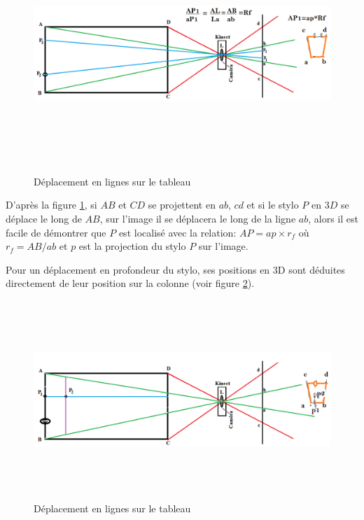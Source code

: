 \documentclass[12pt,a4paper,oneside]{book}
\begin{document}
	\begin{figure}[H]
		\centering
		\includegraphics[height=9cm ,width=15cm]{images/imn1.png}
		\caption{Déplacement en lignes sur le tableau}
		\label{fig1nn}
	\end{figure}
	
	D'après la figure \ref{fig1nn}, si $AB$ et $CD$ se projettent en $ab$, $cd$ et si le stylo $P$ en $3D$ se déplace le long de $AB$, sur l'image il se déplacera le long de la ligne $ab$, alors il est facile de démontrer que $P$ est localisé avec  la relation:
	$AP= ap \times r_f$ où $r_f=AB/ab$ et $p$ est la projection du stylo $P$ sur l'image.
	
	Pour un déplacement en profondeur du stylo, ses positions en 3D sont déduites directement de leur position sur la colonne (voir figure \ref{fig2nn}).
	
	\begin{figure}[H]
		\centering
		\includegraphics[height=7.5cm ,width=15cm]{images/imn2.png}
		\caption{Déplacement en lignes sur le tableau}
		\label{fig2nn}
	\end{figure}
	
\end{document}
